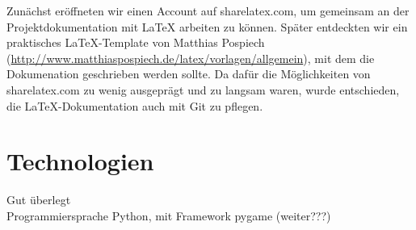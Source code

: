\vspace*{1cm}

Zunächst eröffneten wir einen Account auf sharelatex.com, um gemeinsam an der Projektdokumentation mit LaTeX arbeiten zu können. Später entdeckten wir ein praktisches LaTeX-Template von Matthias Pospiech (\url{http://www.matthiaspospiech.de/latex/vorlagen/allgemein}), mit dem die Dokumenation geschrieben werden sollte. Da dafür die Möglichkeiten von sharelatex.com zu wenig ausgeprägt und zu langsam waren, wurde entschieden, die LaTeX-Dokumentation auch mit Git zu pflegen.



\vspace*{1cm}

\section{Technologien}

Gut überlegt \\

Programmiersprache Python, mit Framework pygame (weiter???)

